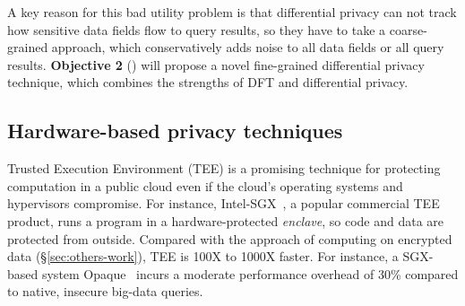 A key reason for this bad utility problem is that differential privacy can not 
track how sensitive data fields flow to query results, so they have to take a 
coarse-grained approach, which conservatively adds noise to all data fields 
or all query results. \textbf{Objective 2} () will propose a 
novel fine-grained differential privacy technique, which combines the strengths 
of DFT and differential privacy.



% 
% 



\vspace{-.15in}\subsection{Hardware-based privacy techniques}
\label{sec:sgx}\vspace{-.075in}

Trusted Execution Environment (TEE) is a promising technique for
protecting computation in a public cloud even if the cloud's operating systems 
and hypervisors compromise. For instance, Intel-SGX~\cite{intel-sgx}, a 
popular commercial TEE product, runs a program in a hardware-protected 
\emph{enclave}, so code and data are protected from outside. Compared with the 
approach of computing on encrypted data (\S\ref{sec:others-work}), TEE is 100X 
to 1000X faster. For instance, a SGX-based system Opaque~\cite{opaque:nsdi17} 
incurs a moderate performance overhead of 30\% compared to native, insecure 
big-data queries.

